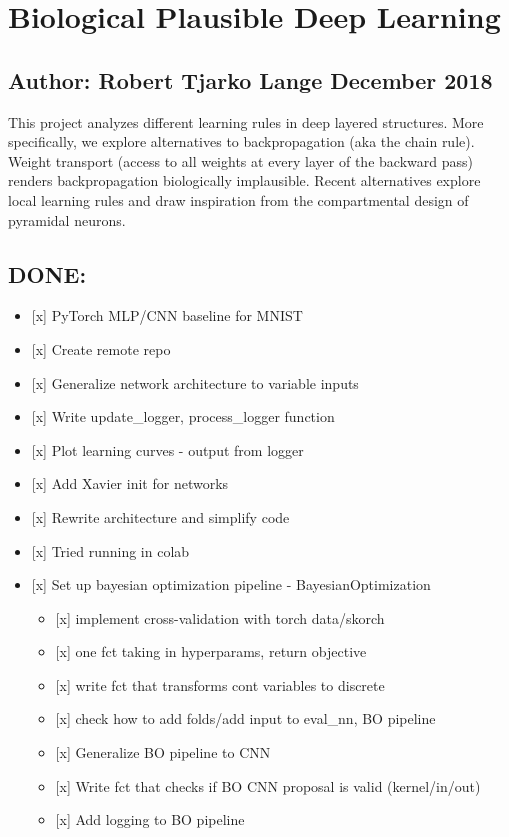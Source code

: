 \hypertarget{biological-plausible-deep-learning}{%
\section{Biological Plausible Deep
Learning}\label{biological-plausible-deep-learning}}

\hypertarget{author-robert-tjarko-lange-december-2018}{%
\subsection{Author: Robert Tjarko Lange \textbar{} December
2018}\label{author-robert-tjarko-lange-december-2018}}

This project analyzes different learning rules in deep layered
structures. More specifically, we explore alternatives to
backpropagation (aka the chain rule). Weight transport (access to all
weights at every layer of the backward pass) renders backpropagation
biologically implausible. Recent alternatives explore local learning
rules and draw inspiration from the compartmental design of pyramidal
neurons.

\hypertarget{done}{%
\subsection{DONE:}\label{done}}

\begin{itemize}
\tightlist
\item
  {[}x{]} PyTorch MLP/CNN baseline for MNIST
\item
  {[}x{]} Create remote repo
\item
  {[}x{]} Generalize network architecture to variable inputs
\item
  {[}x{]} Write update\_logger, process\_logger function
\item
  {[}x{]} Plot learning curves - output from logger
\item
  {[}x{]} Add Xavier init for networks
\item
  {[}x{]} Rewrite architecture and simplify code
\item
  {[}x{]} Tried running in colab
\item
  {[}x{]} Set up bayesian optimization pipeline - BayesianOptimization

  \begin{itemize}
  \tightlist
  \item
    {[}x{]} implement cross-validation with torch data/skorch
  \item
    {[}x{]} one fct taking in hyperparams, return objective
  \item
    {[}x{]} write fct that transforms cont variables to discrete
  \item
    {[}x{]} check how to add folds/add input to eval\_nn, BO pipeline
  \item
    {[}x{]} Generalize BO pipeline to CNN
  \item
    {[}x{]} Write fct that checks if BO CNN proposal is valid
    (kernel/in/out)
  \item
    {[}x{]} Add logging to BO pipeline
  \end{itemize}
\end{itemize}

